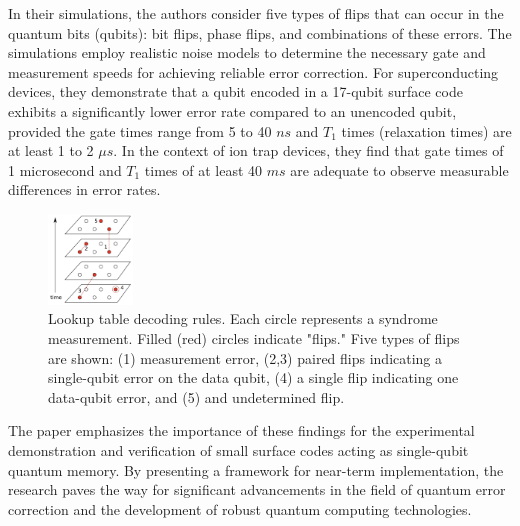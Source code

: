 In their simulations, the authors consider five types of flips that can occur in the quantum bits (qubits): bit flips, phase flips, and combinations of these errors. The simulations employ realistic noise models to determine the necessary gate and measurement speeds for achieving reliable error correction. For superconducting devices, they demonstrate that a qubit encoded in a 17-qubit surface code exhibits a significantly lower error rate compared to an unencoded qubit, provided the gate times range from 5 to 40 $ns$ and $T_1$ times (relaxation times) are at least 1 to 2 $\mu s$. In the context of ion trap devices, they find that gate times of 1 microsecond and $T_1$ times of at least 40 $ms$ are adequate to observe measurable differences in error rates.

\begin{figure}[h]
    \centering
    \includegraphics[width=0.2\textwidth]{sections/5_practical_implementation/LUT_rule.jpg}
    \caption{Lookup table decoding rules. Each circle represents a syndrome measurement. Filled (red) circles indicate "flips." Five types of flips are shown: (1) measurement error, (2,3) paired flips indicating a single-qubit error on the data qubit, (4) a single flip indicating one data-qubit error, and (5) and undetermined flip.}
    \label{fig:LUT_rule}
\end{figure}

The paper emphasizes the importance of these findings for the experimental demonstration and verification of small surface codes acting as single-qubit quantum memory. By presenting a framework for near-term implementation, the research paves the way for significant advancements in the field of quantum error correction and the development of robust quantum computing technologies.